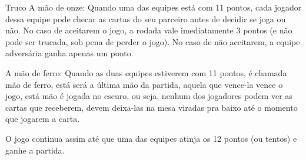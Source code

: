 \begin{subsecao}{Truco}
A mão de onze: Quando uma das equipes está com 11 pontos, cada jogador dessa
equipe pode checar as cartas do seu parceiro antes de decidir se joga ou não.
No caso de aceitarem o jogo, a rodada vale imediatamente 3 pontos (e não pode
ser trucada, sob pena de perder o jogo). No caso de não aceitarem, a equipe
adversária ganha apenas um ponto. 

A mão de ferro: Quando as duas equipes estiverem com 11 pontos, é chamada
mão de ferro, está será a última mão da partida, aquela que vence-la
vence o jogo, está mão é jogada no escuro, ou seja, nenhum dos jogadores
podem ver as cartas que receberem, devem deixa-las na mesa viradas
pra baixo até o momento que jogarem a carta. 

O jogo continua assim até que uma das equipes atinja os 12 pontos (ou tentos) e
ganhe a partida. 

\end{subsecao}
